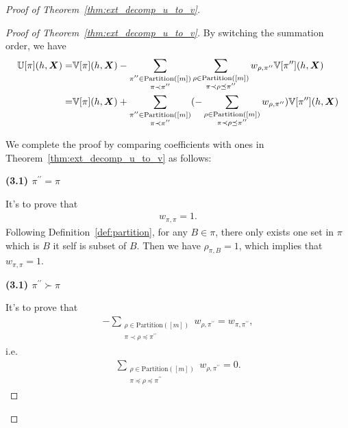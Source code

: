 \documentclass[letterpaper,11pt]{article}
\newcommand{\ustat}{\mathbb{U}}
\newcommand{\vstat}{\mathbb{V}}
\newcommand{\partition}{\mathrm{Partition}}
\newcommand{\partitionp}[1]{\partition(#1)}
\newcommand{\pleq}{\preceq}
\newcommand{\pless}{\prec}
\newcommand{\pgreater}{\succ}
\begin{document}
\begin{proof}[Proof of Theorem~\ref{thm:ext_decomp_u_to_v}]
\begin{proof}[Proof of Theorem~\ref{thm:ext_decomp_u_to_v}]
    By switching the summation order, we have
    \begin{align}\label{eq:decmop_coeff}
        \ustat[\pi](h,\bm{X}) =& \vstat[\pi]( h, \bm{X}) 
        - \sum_{\substack{ \pi^{\prime\prime} \in \partitionp{[m]} \\ \pi \pless \pi^{\prime\prime}}} \sum_{\substack{ \rho \in \partitionp{[m]} \\ \pi \pless \rho \pleq \pi^{\prime\prime}}}
        w_{\rho, \pi^{\prime\prime}}  \vstat[\pi^{\prime\prime}](h, \bm{X}) \notag \\
        =& \vstat[\pi]( h, \bm{X}) + \sum_{\substack{ \pi^{\prime\prime} \in \partitionp{[m]} \\ \pi \pless \pi^{\prime\prime}}} (-\sum_{\substack{ \rho \in \partitionp{[m]} \\ \pi \pless \rho \pleq \pi^{\prime\prime}}}
        w_{\rho, \pi^{\prime\prime}}) \vstat[\pi^{\prime\prime}](h, \bm{X})
    \end{align}

    We complete the proof by comparing coefficients with ones in Theorem~\ref{thm:ext_decomp_u_to_v} as follows:

    {\bf (3.1) $\pi^{\prime\prime} = \pi$}
    
    It's to prove that 
    \begin{align*}
        w_{\pi, \pi} = 1. 
    \end{align*}
    Following Definition~\ref{def:partition}, for any $B \in \pi$, there only exists one set in $\pi$ which is $B$ it self is subset of $B$. Then we have $\rho_{\pi, B} = 1$, which implies that $w_{\pi, \pi} = 1$. 

    {\bf (3.1) $\pi^{\prime\prime} \pgreater \pi$}

    It's to prove that
    \begin{align*}
        -\sum_{\substack{ \rho \in \partitionp{[m]} \\ \pi \pless \rho \pleq \pi^{\prime\prime}}}
        w_{\rho, \pi^{\prime\prime}} = w_{\pi,\pi^{\prime\prime}}, 
    \end{align*}
    i.e.
    \begin{align}\label{eq:summation_w}
        \sum_{\substack{ \rho \in \partitionp{[m]} \\ \pi \pleq \rho \pleq \pi^{\prime\prime}}}
        w_{\rho, \pi^{\prime\prime}} = 0. 
    \end{align}

    \end{proof}
\end{proof}
\end{document}
